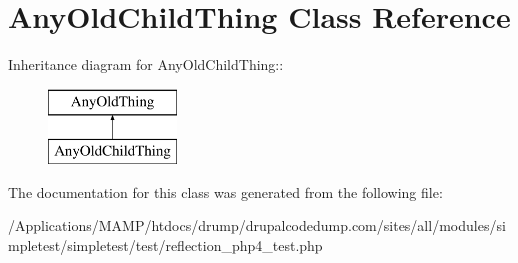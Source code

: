 \hypertarget{class_any_old_child_thing}{
\section{AnyOldChildThing Class Reference}
\label{class_any_old_child_thing}
}
Inheritance diagram for AnyOldChildThing::\begin{figure}[H]
\begin{center}
\leavevmode
\includegraphics[height=2cm]{class_any_old_child_thing}
\end{center}
\end{figure}


The documentation for this class was generated from the following file:\begin{DoxyCompactItemize}
\item 
/Applications/MAMP/htdocs/drump/drupalcodedump.com/sites/all/modules/simpletest/simpletest/test/reflection\_\-php4\_\-test.php\end{DoxyCompactItemize}
